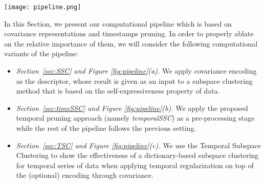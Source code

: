 \documentclass[10pt,a4paper,conference]{IEEEtran}
\begin{document}
\begin{figure*}[t!]\centering
\texttt{[image: pipeline.png]}
\caption{Pipeline of the proposed unsupervised methods for HAR: (a) A covariance descriptor is applied to each sample. Given the obtained covariance matrix is square and symmetrical, we take only the upper (can be also lower) triangular part including the diagonal and flatten it. This results in a new matrix () having size . Following that, any subspace clustering technique can be applied to obtain an affinity graph matrix . Then, spectral clustering is applied using  to obtain cluster labels and the Hungarian algorithm finds the matching between the cluster labels (predicted action classes) and the ground-truth labels. (b) The skeletal data of each sample is temporally pruned using temporalSSC and then the pruned data is processed as in (a).
(c) Each sample is pruned
by using various strategies. 
Afterwards, temporal subspace clustering is applied to obtain an affinity graph matrix . The normalized cuts is applied to obtain cluster labels and the Hungarian algorithm matches the cluster labels with the ground-truth labels.}
\label{fig:pipeline}
\end{figure*}

In this Section, we present our computational pipeline which is based on covariance representations and timestamps pruning. In order to properly ablate on the relative importance of them, we will consider the following computational variants of the pipeline:
\begin{itemize}
    \item \emph{Section~\ref{sec:SSC} and Figure \ref{fig:pipeline}(a).} We apply covariance encoding as the descriptor, whose result is given as an input to a subspace clustering method that is based on the self-expressiveness property of data. \item \textit{Section~\ref{sec:timeSSC} and Figure \ref{fig:pipeline}(b).} We apply the proposed temporal pruning approach (namely \emph{temporalSSC}) as a pre-processing stage while the rest of the pipeline follows the previous setting.\item \textit{Section~\ref{sec:TSC} and Figure \ref{fig:pipeline}(c).} We use the Temporal Subspace Clustering to show the effectiveness of a dictionary-based subspace clustering for temporal series of data when applying temporal regularization on top of the (optional) encoding through covariance. \end{itemize} 
\end{document}
